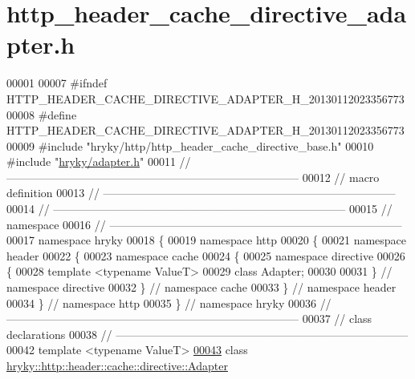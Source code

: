 \hypertarget{http__header__cache__directive__adapter_8h_source}{\section{http\-\_\-header\-\_\-cache\-\_\-directive\-\_\-adapter.\-h}
}

\begin{DoxyCode}
00001 
00007 \textcolor{preprocessor}{#ifndef HTTP\_HEADER\_CACHE\_DIRECTIVE\_ADAPTER\_H\_20130112023356773}
00008 \textcolor{preprocessor}{}\textcolor{preprocessor}{#define HTTP\_HEADER\_CACHE\_DIRECTIVE\_ADAPTER\_H\_20130112023356773}
00009 \textcolor{preprocessor}{}\textcolor{preprocessor}{#include "hryky/http/http\_header\_cache\_directive\_base.h"}
00010 \textcolor{preprocessor}{#include "\hyperlink{adapter_8h}{hryky/adapter.h}"}
00011 \textcolor{comment}{//
      ------------------------------------------------------------------------------}
00012 \textcolor{comment}{// macro definition}
00013 \textcolor{comment}{//
      ------------------------------------------------------------------------------}
00014 \textcolor{comment}{//
      ------------------------------------------------------------------------------}
00015 \textcolor{comment}{// namespace}
00016 \textcolor{comment}{//
      ------------------------------------------------------------------------------}
00017 \textcolor{keyword}{namespace }hryky
00018 \{
00019 \textcolor{keyword}{namespace }http
00020 \{
00021 \textcolor{keyword}{namespace }header
00022 \{
00023 \textcolor{keyword}{namespace }cache
00024 \{
00025 \textcolor{keyword}{namespace }directive
00026 \{
00028     \textcolor{keyword}{template} <\textcolor{keyword}{typename} ValueT>
00029     \textcolor{keyword}{class }Adapter;
00030 
00031 \} \textcolor{comment}{// namespace directive}
00032 \} \textcolor{comment}{// namespace cache}
00033 \} \textcolor{comment}{// namespace header}
00034 \} \textcolor{comment}{// namespace http}
00035 \} \textcolor{comment}{// namespace hryky}
00036 \textcolor{comment}{//
      ------------------------------------------------------------------------------}
00037 \textcolor{comment}{// class declarations}
00038 \textcolor{comment}{//
      ------------------------------------------------------------------------------}
00042 \textcolor{comment}{}\textcolor{keyword}{template} <\textcolor{keyword}{typename} ValueT>
\hypertarget{http__header__cache__directive__adapter_8h_source_l00043}{}\hyperlink{classhryky_1_1http_1_1header_1_1cache_1_1directive_1_1_adapter}{00043} \textcolor{keyword}{class }\hyperlink{classhryky_1_1http_1_1header_1_1cache_1_1directive_1_1_adapter}{hryky::http::header::cache::directive::Adapter}

\end{DoxyCode}

